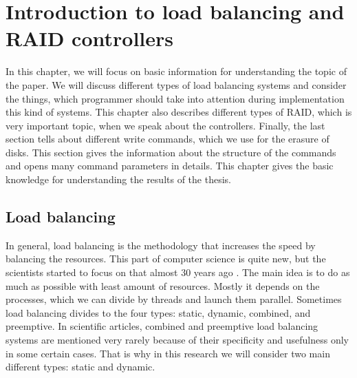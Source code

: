 \chapter{Introduction to load balancing and RAID controllers}
\label{chap2:title}

In this chapter, we will focus on basic information for understanding the topic of the paper. We will discuss different types of load balancing systems and consider the things, which programmer should take into attention during implementation this kind of systems. This chapter also describes different types of RAID, which is very important topic, when we speak about the controllers. Finally, the last section tells about different write commands, which we use for the erasure of disks. This section gives the information about the structure of the commands and opens many command parameters in details. This chapter gives the basic knowledge for understanding the results of the thesis.

\newpage
\section{Load balancing}
In general, load balancing is the methodology that increases the speed by balancing the resources. This part of computer science is quite new, but the scientists started to focus on that almost 30 years ago \cite{stat_load_bal_1985}. The main idea is to do as much as possible with least amount of resources. Mostly it depends on the processes, which we can divide by threads and launch them parallel. Sometimes load balancing divides to the four types: static, dynamic, combined, and preemptive. In scientific articles, combined and preemptive load balancing systems are mentioned very rarely because of their specificity and usefulness only in some certain cases. That is why in this research we will consider two main different types: static and dynamic.

